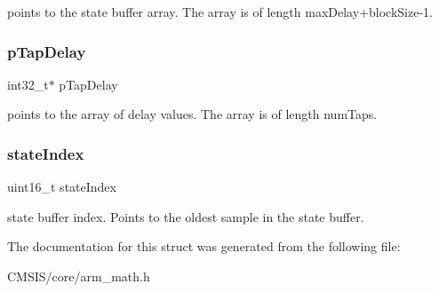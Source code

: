 points to the state buffer array. The array is of length max\+Delay+block\+Size-\/1. \mbox{\label{structarm__fir__sparse__instance__q15_adec00b3793ab4f08edfeb4ea6a9eb6e6}} 
\subsubsection{\texorpdfstring{p\+Tap\+Delay}{pTapDelay}}
{\footnotesize\ttfamily int32\+\_\+t$\ast$ p\+Tap\+Delay}

points to the array of delay values. The array is of length num\+Taps. \mbox{\label{structarm__fir__sparse__instance__q15_a566a0cb53437e48b9a3bf18e5b03d8aa}} 
\subsubsection{\texorpdfstring{state\+Index}{stateIndex}}
{\footnotesize\ttfamily uint16\+\_\+t state\+Index}

state buffer index. Points to the oldest sample in the state buffer. 

The documentation for this struct was generated from the following file\+:\begin{DoxyCompactItemize}
\item 
C\+M\+S\+I\+S/core/arm\+\_\+math.\+h\end{DoxyCompactItemize}
